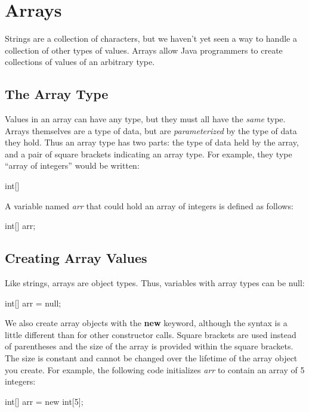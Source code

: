 \section{Arrays}

Strings are a collection of characters, but we haven't yet seen a way to handle a collection of other types of values. Arrays allow Java programmers to create collections of values of an arbitrary type. 

\subsection{The Array Type}

Values in an array can have any type, but they must all have the \textit{same} type. Arrays themselves are a type of data, but are \textit{parameterized} by the type of data they hold. Thus an array type has two parts: the type of data held by the array, and a pair of square brackets indicating an array type. For example, they type ``array of integers'' would be written:
\begin{code}
int[] 
\end{code}

A variable named \textit{arr} that could hold an array of integers is defined as follows:

\begin{code}
int[] arr;
\end{code}

\subsection{Creating Array Values}

Like strings, arrays are object types. Thus, variables with array types can be null:

\begin{code}
int[] arr = null;
\end{code}

We also create array objects with the \textbf{new} keyword, although the syntax is a little different than for other constructor calls. Square brackets are used instead of parentheses and the size of the array is provided within the square brackets. The size is constant and cannot be changed over the lifetime of the array object you create. For example, the following code initializes \textit{arr} to contain an array of 5 integers:

\begin{code}
int[] arr = new int[5];
\end{code}

